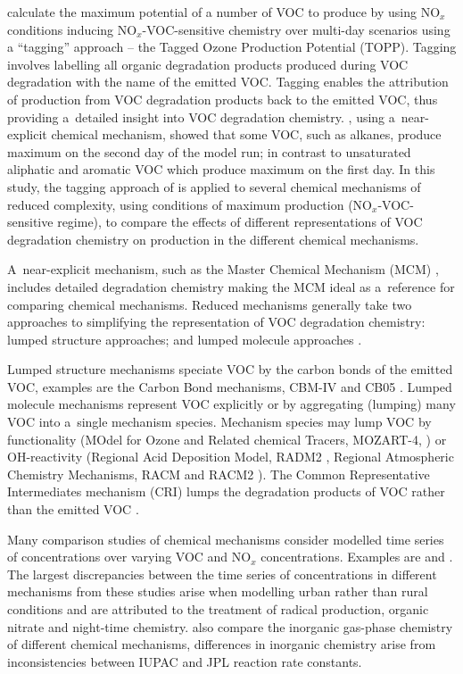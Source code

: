 \documentclass[acpd, online, hvmath]{copernicus}
\begin{document}
\citet{Butler:2011} calculate the maximum potential of a number of VOC to produce
 by using NO$_{x}$ conditions inducing
NO$_{x}$-VOC-sensitive chemistry over multi-day scenarios using a
``tagging'' approach -- the Tagged Ozone Production Potential (TOPP).
Tagging involves labelling all organic degradation products produced
during VOC degradation with the name of the emitted VOC.  Tagging
enables the attribution of  production from VOC degradation
products back to the emitted VOC, thus providing a~detailed insight
into VOC degradation chemistry.  \citet{Butler:2011}, using
a~near-explicit chemical mechanism, showed that some VOC, such as
alkanes, produce maximum  on the second day of the model
run; in contrast to unsaturated aliphatic and aromatic VOC which
produce maximum  on the first day.  In this study, the
tagging approach of \citet{Butler:2011} is applied to several chemical
mechanisms of reduced complexity, using conditions of maximum
 production (NO$_{x}$-VOC-sensitive regime), to compare
the effects of different representations of VOC degradation chemistry
on  production in the different chemical mechanisms.

A~near-explicit mechanism, such as the Master Chemical Mechanism (MCM)
\citep{Jenkin:2003, Saunders:2003, Bloss:2005}, includes detailed
degradation chemistry making the MCM ideal as a~reference for
comparing chemical mechanisms.  Reduced mechanisms generally take two
approaches to simplifying the representation of VOC degradation
chemistry: lumped structure approaches; and lumped molecule approaches
\citep{Dodge:2000}.

Lumped structure mechanisms speciate VOC by the carbon bonds of the
emitted VOC, examples are the Carbon Bond mechanisms, CBM-IV
\citep{Gery:1989} and CB05 \citep{Yarwood:2005}.  Lumped molecule
mechanisms represent VOC explicitly or by aggregating (lumping) many
VOC into a~single mechanism species.  Mechanism species may lump VOC
by functionality (MOdel for Ozone and Related chemical Tracers,
MOZART-4, \citealp{Emmons:2010}) or OH-reactivity (Regional Acid
Deposition Model, RADM2 \citep{Stockwell:1990}, Regional Atmospheric
Chemistry Mechanisms, RACM \citep{Stockwell:1997} and RACM2
\citep{Goliff:2013}).  The Common Representative Intermediates
mechanism (CRI) lumps the degradation products of VOC rather than the
emitted VOC \citep{Jenkin:2008}.

Many comparison studies of chemical mechanisms consider modelled time
series of  concentrations over varying VOC and NO$_{x}$
concentrations.  Examples are \citet{Dunker:1984,Kuhn:1998} and
\citet{Emmerson:2009}.  The largest discrepancies between the time
series of  concentrations in different mechanisms from these
studies arise when modelling urban rather than rural conditions and
are attributed to the treatment of radical production, organic nitrate
and night-time chemistry.  \citet{Emmerson:2009} also compare the
inorganic gas-phase chemistry of different chemical mechanisms,
differences in inorganic chemistry arise from inconsistencies between
IUPAC and JPL reaction rate constants.
\end{document}
